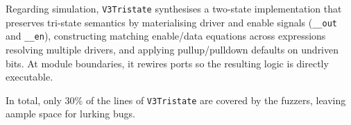 Regarding simulation, \texttt{V3Tristate} synthesises a two-state implementation that preserves tri-state semantics by materialising driver and enable signals (\texttt{\_\_out} and \texttt{\_\_en}), constructing matching enable/data equations across expressions resolving multiple drivers, and applying pullup/pulldown defaults on undriven bits.
At module boundaries, it rewires ports so the resulting logic is directly executable.

In total, only 30\% of the lines of \texttt{V3Tristate} are covered by the fuzzers, leaving aample space for lurking bugs.
